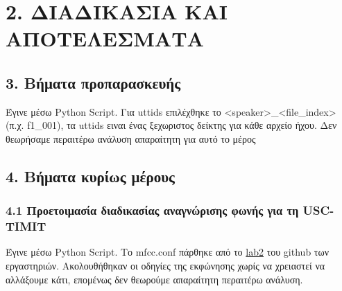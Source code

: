 \documentclass{article}
\begin{document}
\section*{2. ΔΙΑΔΙΚΑΣΙΑ ΚΑΙ ΑΠΟΤΕΛΕΣΜΑΤΑ}
\subsection*{3. Βήματα προπαρασκευής}
Έγινε μέσω Python Script. Για uttids επιλέχθηκε το <speaker>\_<file\_index> (π.χ. f1\_001), τα uttids ειναι ένας ξεχωριστος δείκτης για κάθε αρχείο ήχου. Δεν θεωρήσαμε περαιτέρω ανάλυση απαραίτητη για αυτό το μέρος
\subsection*{4. Βήματα κυρίως μέρους}
\subsubsection*{4.1 Προετοιμασία διαδικασίας αναγνώρισης φωνής για τη USC-TIMIT}
Έγινε μέσω Python Script. Το mfcc.conf πάρθηκε από το \href{https://github.com/slp-ntua/slp-labs/tree/master/lab2}{lab2} του github των εργαστηριών. Ακολουθήθηκαν οι οδηγίες της εκφώνησης χωρίς να χρειαστεί να αλλάξουμε κάτι, επομένως δεν θεωρούμε απαραίτητη περαιτέρω ανάλυση. 
\end{document}
